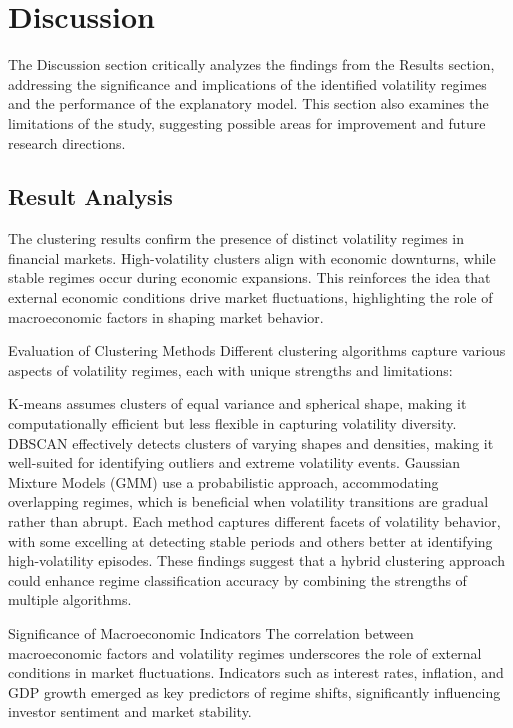 \chapter{Discussion}

The Discussion section critically analyzes the findings from the Results section, addressing the significance and implications of the identified volatility regimes and the performance of the explanatory model. This section also examines the limitations of the study, suggesting possible areas for improvement and future research directions.

\section{Result Analysis}

The clustering results confirm the presence of distinct volatility regimes in financial markets. High-volatility clusters align with economic downturns, while stable regimes occur during economic expansions. This reinforces the idea that external economic conditions drive market fluctuations, highlighting the role of macroeconomic factors in shaping market behavior.

Evaluation of Clustering Methods
Different clustering algorithms capture various aspects of volatility regimes, each with unique strengths and limitations:

K-means assumes clusters of equal variance and spherical shape, making it computationally efficient but less flexible in capturing volatility diversity.
DBSCAN effectively detects clusters of varying shapes and densities, making it well-suited for identifying outliers and extreme volatility events.
Gaussian Mixture Models (GMM) use a probabilistic approach, accommodating overlapping regimes, which is beneficial when volatility transitions are gradual rather than abrupt.
Each method captures different facets of volatility behavior, with some excelling at detecting stable periods and others better at identifying high-volatility episodes. These findings suggest that a hybrid clustering approach could enhance regime classification accuracy by combining the strengths of multiple algorithms.

Significance of Macroeconomic Indicators
The correlation between macroeconomic factors and volatility regimes underscores the role of external conditions in market fluctuations. Indicators such as interest rates, inflation, and GDP growth emerged as key predictors of regime shifts, significantly influencing investor sentiment and market stability.

